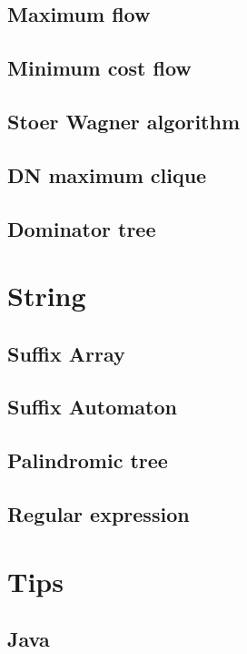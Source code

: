 \documentclass[titlepage, a4paper,10pt]{article}
\begin{document}
\begin{multicols}{2}
\begin{spacing}{0.6}
{			\subsection{Maximum flow}
				
			\subsection{Minimum cost flow}
				
			\subsection{Stoer Wagner algorithm}
				
			\subsection{DN maximum clique}
				
			\subsection{Dominator tree}
				
		\section{String}
			\subsection{Suffix Array}
				
			\subsection{Suffix Automaton}
				
			\subsection{Palindromic tree}
				
			\subsection{Regular expression}
				
		\section{Tips}
			\subsection{Java}
				
}
\end{spacing}
\end{multicols}
\end{document}
